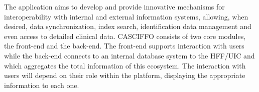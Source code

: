 The application aims to develop and provide innovative mechanisms for interoperability with internal and external information systems, allowing, when desired, data synchronization, index search, identification data management and even access to detailed clinical data. 
CASCIFFO consists of two core modules, the front-end and the back-end. The front-end supports interaction with users while the back-end connects to an internal database system to the HFF/UIC and which aggregates the total information of this ecosystem.  
The interaction with users will depend on their role within the platform, displaying the appropriate information to each one. 


